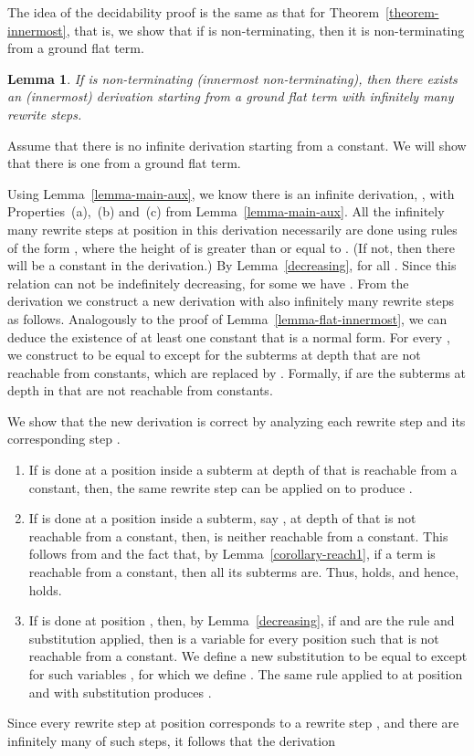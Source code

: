 \documentclass{LMCS}
\theoremstyle{plain}
\newtheorem{lemma}[thm]{Lemma}
\begin{document}
The idea of the decidability proof is the same as that
for Theorem~\ref{theorem-innermost}, that is, we show
that if  is non-terminating, then it is non-terminating
from a ground flat term.

\begin{lemma}\label{lemma-main}
If  is non-terminating (innermost non-terminating), then
there exists an (innermost) derivation starting from
a ground flat term with infinitely many rewrite steps.
\end{lemma}
\proof
Assume that
there is no infinite derivation starting from a constant.
We will show that there is one from a ground flat term.





Using Lemma~\ref{lemma-main-aux}, we know there is
an infinite derivation,
,
with Properties~(a),~(b) and~(c) from Lemma~\ref{lemma-main-aux}.
All the infinitely many rewrite steps at position 
in this derivation necessarily are done using rules of the form 
,
where the height of  is greater than or equal to .
(If not, then there will be a constant in the derivation.)
By Lemma~\ref{decreasing},  for all .
Since this relation can not be indefinitely decreasing,
for some  we have .
From the derivation 
we construct a new derivation
 with also infinitely many rewrite steps as follows.
Analogously to the
proof of Lemma~\ref{lemma-flat-innermost}, 
we can deduce the existence of 
at least one constant  that is a normal form.
For every , we construct  to be equal to 
except for the subterms at depth  that are not reachable
from constants, which are replaced by . Formally,
 if 
are the subterms at depth  in  that are not reachable
from constants.

We show that the new derivation is correct by analyzing each
rewrite step  and its corresponding
step . 
\begin{enumerate}[(1)]
\item If 
is done at a position inside a subterm at depth  of 
that is reachable from a constant, then, the same rewrite
step can be applied on  to produce .
\item
If 
is done at a position inside a subterm, say ,
at depth  of 
that is not reachable from a constant, then,
 is neither reachable from a constant.
This follows from 
and the fact that, by Lemma~\ref{corollary-reach1},
if a term is reachable from a constant, then all
its subterms are. Thus,  holds, and
hence,  holds.
\item
If 
is done at position , then, by Lemma~\ref{decreasing},
if  and  are the rule
and substitution applied,
then  is a variable for 
every position  such that  
is not reachable from a constant.
We define a new substitution 
to be equal to  except for such variables ,
for which we define . The same rule
 applied to 
at position  and with substitution 
produces .
\end{enumerate}
Since every rewrite step 
at position  corresponds to a rewrite step
, and there are infinitely many of
such steps, it follows that the derivation
\end{document}
